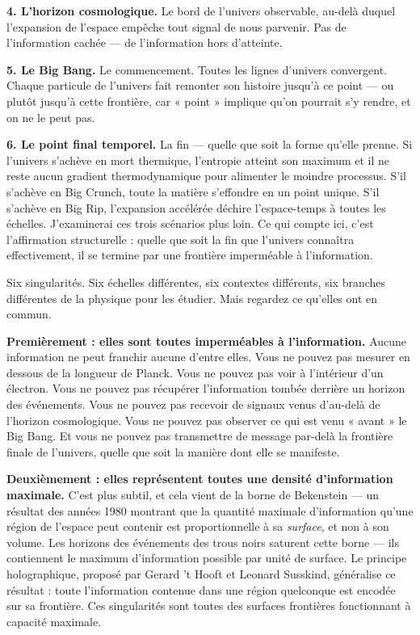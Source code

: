 \documentclass[11pt, twoside, openright]{book}
\begin{document}
\textbf{4. L'horizon cosmologique.} Le bord de l'univers observable, au-delà duquel l'expansion de l'espace empêche tout signal de nous parvenir. Pas de l'information cachée --- de l'information hors d'atteinte.

\textbf{5. Le Big Bang.} Le commencement. Toutes les lignes d'univers convergent. Chaque particule de l'univers fait remonter son histoire jusqu'à ce point --- ou plutôt jusqu'à cette frontière, car « point » implique qu'on pourrait s'y rendre, et on ne le peut pas.

\textbf{6. Le point final temporel.} La fin --- quelle que soit la forme qu'elle prenne. Si l'univers s'achève en mort thermique, l'entropie atteint son maximum et il ne reste aucun gradient thermodynamique pour alimenter le moindre processus. S'il s'achève en Big Crunch, toute la matière s'effondre en un point unique. S'il s'achève en Big Rip, l'expansion accélérée déchire l'espace-temps à toutes les échelles. J'examinerai ces trois scénarios plus loin. Ce qui compte ici, c'est l'affirmation structurelle : quelle que soit la fin que l'univers connaîtra effectivement, il se termine par une frontière imperméable à l'information.

Six singularités. Six échelles différentes, six contextes différents, six branches différentes de la physique pour les étudier. Mais regardez ce qu'elles ont en commun.

\textbf{Premièrement : elles sont toutes imperméables à l'information.} Aucune information ne peut franchir aucune d'entre elles. Vous ne pouvez pas mesurer en dessous de la longueur de Planck. Vous ne pouvez pas voir à l'intérieur d'un électron. Vous ne pouvez pas récupérer l'information tombée derrière un horizon des événements. Vous ne pouvez pas recevoir de signaux venus d'au-delà de l'horizon cosmologique. Vous ne pouvez pas observer ce qui est venu « avant » le Big Bang. Et vous ne pouvez pas transmettre de message par-delà la frontière finale de l'univers, quelle que soit la manière dont elle se manifeste.

\textbf{Deuxièmement : elles représentent toutes une densité d'information maximale.} C'est plus subtil, et cela vient de la borne de Bekenstein --- un résultat des années 1980 montrant que la quantité maximale d'information qu'une région de l'espace peut contenir est proportionnelle à sa \textit{surface}, et non à son volume. Les horizons des événements des trous noirs saturent cette borne --- ils contiennent le maximum d'information possible par unité de surface. Le principe holographique, proposé par Gerard 't Hooft et Leonard Susskind, généralise ce résultat : toute l'information contenue dans une région quelconque est encodée sur sa frontière. Ces singularités sont toutes des surfaces frontières fonctionnant à capacité maximale.
\end{document}
